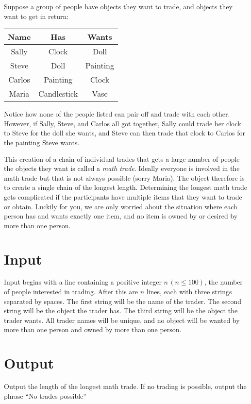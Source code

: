 \documentclass{article}
\begin{document}
Suppose a group of people have objects they want to trade, and objects they want to get in return:

\begin{center}
\begin {tabular} {c c c}
  Name & Has & Wants \\ \hline
  Sally & Clock & Doll \\
  Steve & Doll & Painting \\
  Carlos & Painting & Clock \\
  Maria & Candlestick & Vase \\ \hline
\end {tabular}
\end{center}
Notice how none of the people listed can pair off and trade with each other.  However, if Sally, Steve, and Carlos all got together, Sally could trade her clock to Steve for the doll she wants, and Steve can then trade that clock to Carlos for the painting Steve wants.

This creation of a chain of individual trades that gets a large number of people the objects they want is called a {\em math trade}. Ideally everyone is involved in the math trade but that is not always possible (sorry Maria). The object therefore is to create a single chain of the longest length. Determining the longest math trade gets complicated if the participants have multiple items that they want to trade or obtain.  Luckily for you, we are only worried about the situation where each person has and wants exactly one item, and no item is owned by or desired by more than one person.

\section*{Input}

Input begins with a line containing a positive integer $n\,(n \leq 100)$, the number of people interested in trading.  After this are $n$ lines, each with three strings separated by spaces.  The first string will be the name of the trader.  The second string will be the object the trader has.  The third string will be the object the trader wants.  All trader names will be unique, and no object will be wanted by more than one person and owned by more than one person.

\section*{Output}
Output the length of the longest math trade.  If no trading is possible, output the phrase ``No trades possible''
  
\end{document}
